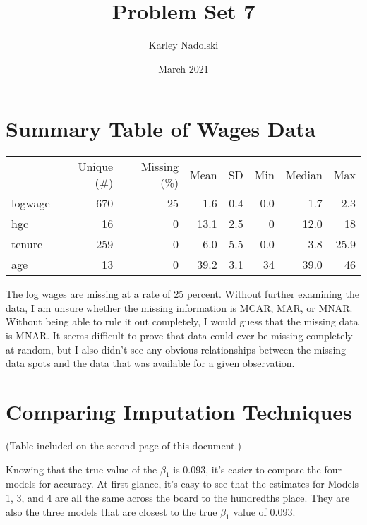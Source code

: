 \documentclass{article}
\title{Problem Set 7}
\author{Karley Nadolski}
\date{March 2021}
\begin{document}
\maketitle

\section{Summary Table of Wages Data}
\begin{table} [ht]
\centering
\begin{tabular}[t]{lrrrrrrr}
  & Unique (\#) & Missing (\%) & Mean & SD & Min & Median & Max\\
logwage & 670 & 25 & 1.6 & 0.4 & 0.0 & 1.7 & 2.3\\
hgc & 16 & 0 & 13.1 & 2.5 & 0 & 12.0 & 18\\
tenure & 259 & 0 & 6.0 & 5.5 & 0.0 & 3.8 & 25.9\\
age & 13 & 0 & 39.2 & 3.1 & 34 & 39.0 & 46\\
\end{tabular}
\end{table}
The log wages are missing at a rate of 25 percent. Without further examining the data, I am unsure whether the missing information is MCAR, MAR, or MNAR. Without being able to rule it out completely, I would guess that the missing data is MNAR. It seems difficult to prove that data could ever be missing completely at random, but I also didn't see any obvious relationships between the missing data spots and the data that was available for a given observation.  

\section{Comparing Imputation Techniques}
(Table included on the second page of this document.)

Knowing that the true value of the $\beta_1$ is 0.093, it's easier to compare the four models for accuracy. At first glance, it's easy to see that the estimates for Models 1, 3, and 4 are all the same across the board to the hundredths place. They are also the three models that are closest to the true $\beta_1$ value of 0.093. 
\end{document}
